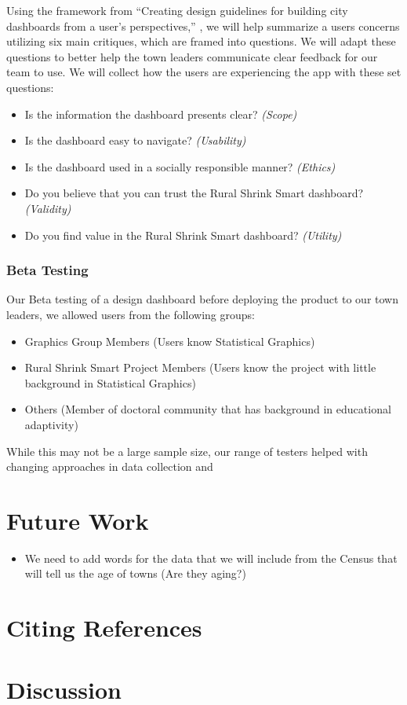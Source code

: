 \documentclass[letterpaper,inpress]{jdsart}
\providecommand{\tightlist}{%
  \setlength{\itemsep}{0pt}\setlength{\parskip}{0pt}}
\begin{document}
Using the framework from ``Creating design guidelines for building city dashboards from a user's perspectives,'' \citet{young}, we will help summarize a users concerns utilizing six main critiques, which are framed into questions. We will adapt these questions to better help the town leaders communicate clear feedback for our team to use. We will collect how the users are experiencing the app with these set questions:

\begin{itemize}
\item Is the information the dashboard presents clear? \textit{(Scope)}
\item Is the dashboard easy to navigate? \textit{(Usability)}
\item Is the dashboard used in a socially responsible manner? \textit{(Ethics)}
\item Do you believe that you can trust the Rural Shrink Smart dashboard? \textit{(Validity)}
\item Do you find value in the Rural Shrink Smart dashboard? \textit{(Utility)}
\end{itemize}

\subsubsection{Beta Testing}

Our Beta testing of a design dashboard before deploying the product to our town leaders, we allowed users from the following groups:

\begin{itemize}
    \item Graphics Group Members (Users know Statistical Graphics)
    \item Rural Shrink Smart Project Members (Users know the project with little background in Statistical Graphics)
    \item  Others (Member of doctoral community that has background in educational adaptivity)
\end{itemize}

While this may not be a large sample size, our range of testers helped with changing approaches in data collection and

\hypertarget{future-work}{%
\section{Future Work}\label{future-work}}

\begin{itemize}
\tightlist
\item
  We need to add words for the data that we will include from the Census that will tell us the age of towns (Are they aging?)
\end{itemize}

\hypertarget{citing-references}{%
\section{Citing References}\label{citing-references}}

\hypertarget{discussion}{%
\section{Discussion}\label{discussion}}

\lipsum[1-3]
\end{document}
